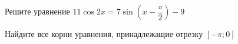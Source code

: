 \begin{ex}
	\begin{condition}
		\begin{enumcols}[label=\asbuk*)]
			\item Решите уравнение \( 11\cos 2x = 7\sin{\left(x-\dfrac{\pi}{2}\right)} - 9 \)
			\item Найдите все корни уравнения, принадлежащие отрезку \( \left[-\pi;0\right] \)
		\end{enumcols}
	\end{condition}
\end{ex}
